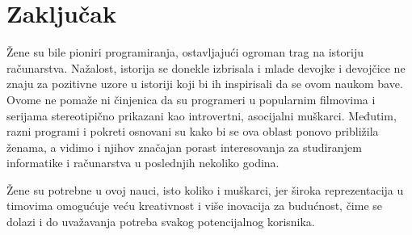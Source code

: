 \documentclass[12pt]{article}
\begin{document}
\newpage

\section{Zaključak}

Žene su bile pioniri programiranja, ostavljajući ogroman trag na istoriju računarstva. Nažalost, istorija se donekle izbrisala i mlade devojke i devojčice ne znaju za pozitivne uzore u istoriji koji bi ih inspirisali da se ovom naukom bave. Ovome ne pomaže ni činjenica da su programeri u popularnim filmovima i serijama stereotipično prikazani kao introvertni, asocijalni muškarci. Međutim, razni programi i pokreti osnovani su kako bi se ova oblast ponovo približila ženama, a vidimo i njihov značajan porast interesovanja za studiranjem informatike i računarstva u poslednjih nekoliko godina. 

Žene su potrebne u ovoj nauci, isto koliko i muškarci, jer široka reprezentacija u timovima omogućuje veću kreativnost i više inovacija za budućnost, čime se dolazi i do uvažavanja potreba svakog potencijalnog korisnika.

\newpage
\end{document}
